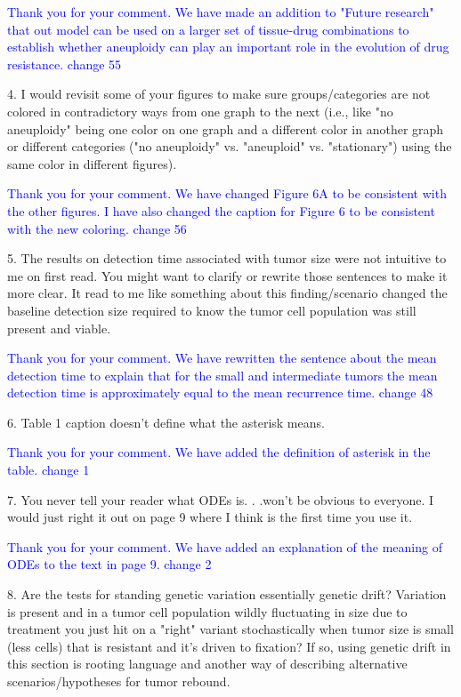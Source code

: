 \documentclass[11pt,a4paper]{article}
\begin{document}
\textcolor{blue}{Thank you for your comment.  We have made an addition to "Future research" that out model can be used on a larger set of tissue-drug combinations to establish whether aneuploidy can play an important role in the evolution of drug resistance. change 55} 

4. I would revisit some of your figures to make sure groups/categories are not colored in contradictory ways from one graph to the next (i.e., like "no aneuploidy" being one color on one graph and a different color in another graph or different categories ("no aneuploidy" vs. "aneuploid" vs. "stationary") using the same color in different figures).

\textcolor{blue}{Thank you for your comment.  We have changed Figure 6A to be consistent with the other figures. I have also changed the caption for Figure 6 to be consistent with the new coloring. change 56} 

5. The results on detection time associated with tumor size were not intuitive to me on first read. You might want to clarify or rewrite those sentences to make it more clear. It read to me like something about this finding/scenario changed the baseline detection size required to know the tumor cell population was still present and viable.

\textcolor{blue}{Thank you for your comment. We have rewritten the sentence about the mean detection time to explain that for the small and intermediate tumors the mean detection time is approximately  equal to the mean recurrence time. change 48} 

6. Table 1 caption doesn't define what the asterisk means.

\textcolor{blue}{Thank you for your comment. We have added the definition of asterisk in the table. change 1} 

7. You never tell your reader what ODEs is. . .won't be obvious to everyone. I would just right it out on page 9 where I think is the first time you use it.

\textcolor{blue}{Thank you for your comment. We have added an explanation of the meaning of ODEs to the text in page 9. change 2} 

8. Are the tests for standing genetic variation essentially genetic drift? Variation is present and in a tumor cell population wildly fluctuating in size due to treatment you just hit on a "right" variant stochastically when tumor size is small (less cells) that is resistant and it's driven to fixation? If so, using genetic drift in this section is rooting language and another way of describing alternative scenarios/hypotheses for tumor rebound.
\end{document}

